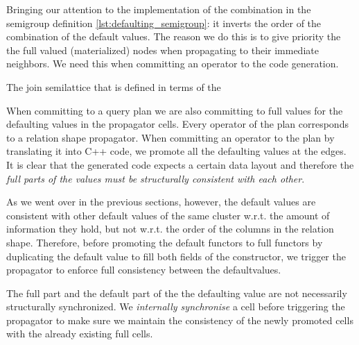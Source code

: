 Bringing our attention to the implementation of the 
combination in the semigroup definition
\ref{lst:defaulting_semigroup}: it inverts the order of the
combination of the default values. The reason we do this is to give
priority the the full valued (materialized) nodes when propagating to
their immediate neighbors. We need this when committing an operator to
the code generation.

\begin{code}

  \caption{\label{lst:defaulting_semigroup}The join semilattice that is defined in terms of the}
\end{code}

When committing to a query plan we are also committing to full values
for the defaulting values in the propagator cells. Every operator of
the plan corresponds to a relation shape propagator. When committing
an operator to the plan by translating it into C++ code, we promote
all the defaulting values at the edges. It is clear that the generated
code expects a certain data layout and therefore the \emph{full parts
of the values must be structurally consistent with each other}.

As we went over in the previous sections, however, the default values
are consistent with other default values of the same cluster
w.r.t. the amount of information they hold, but not w.r.t. the order
of the columns in the relation shape. Therefore, before promoting the
default functors to full functors by duplicating the default value to
fill both fields of the  constructor, we trigger
the propagator to enforce full consistency between the defaultvalues.

The full part and the default part of the the defaulting value are not
necessarily structurally synchronized. We \emph{internally
synchronise} a cell before triggering the propagator to make sure we
maintain the consistency of the newly promoted cells with the already
existing full cells.

